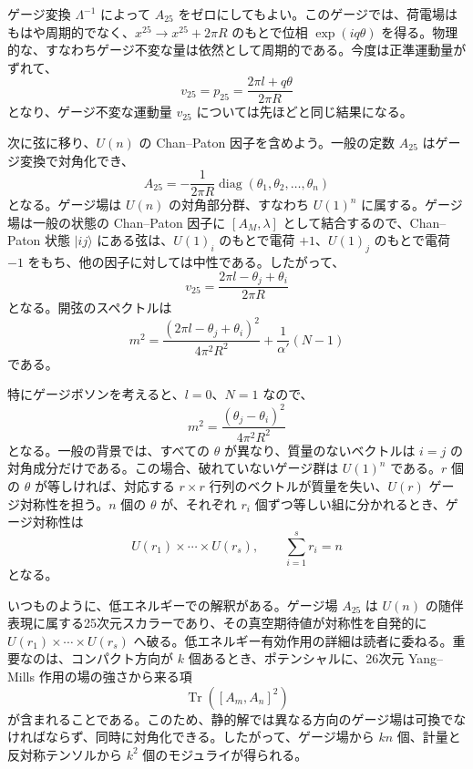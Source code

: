 ゲージ変換 $\Lambda^{-1}$ によって $A_{25}$ をゼロにしてもよい。このゲージでは、荷電場はもはや周期的でなく、$x^{25}\to x^{25}+2\pi R$ のもとで位相 $\exp(iq\theta)$ を得る。物理的な、すなわちゲージ不変な量は依然として周期的である。今度は正準運動量がずれて、
\begin{equation}
v_{25}=p_{25}=\frac{2\pi l+q\theta}{2\pi R}
\tag{8.6.7}\label{eq:8.6.7}
\end{equation}
となり、ゲージ不変な運動量 $v_{25}$ については先ほどと同じ結果になる。

次に弦に移り、$U(n)$ の Chan--Paton 因子を含めよう。一般の定数 $A_{25}$ はゲージ変換で対角化でき、
\begin{equation}
A_{25}=-\frac1{2\pi R}\operatorname{diag}(\theta_1,\theta_2,\ldots,\theta_n)
\tag{8.6.8}\label{eq:8.6.8}
\end{equation}
となる。ゲージ場は $U(n)$ の対角部分群、すなわち $U(1)^n$ に属する。ゲージ場は一般の状態の Chan--Paton 因子に $[A_M,\lambda]$ として結合するので、Chan--Paton 状態 $|ij\rangle$ にある弦は、$U(1)_i$ のもとで電荷 $+1$、$U(1)_j$ のもとで電荷 $-1$ をもち、他の因子に対しては中性である。したがって、
\begin{equation}
v_{25}=\frac{2\pi l-\theta_j+\theta_i}{2\pi R}
\tag{8.6.9}\label{eq:8.6.9}
\end{equation}
となる。開弦のスペクトルは
\begin{equation}
m^2=\frac{(2\pi l-\theta_j+\theta_i)^2}{4\pi^2R^2}
+\frac1{\alpha'}(N-1)
\tag{8.6.10}\label{eq:8.6.10}
\end{equation}
である。

特にゲージボソンを考えると、$l=0$、$N=1$ なので、
\begin{equation}
m^2=\frac{(\theta_j-\theta_i)^2}{4\pi^2R^2}
\tag{8.6.11}\label{eq:8.6.11}
\end{equation}
となる。一般の背景では、すべての $\theta$ が異なり、質量のないベクトルは $i=j$ の対角成分だけである。この場合、破れていないゲージ群は $U(1)^n$ である。$r$ 個の $\theta$ が等しければ、対応する $r\times r$ 行列のベクトルが質量を失い、$U(r)$ ゲージ対称性を担う。$n$ 個の $\theta$ が、それぞれ $r_i$ 個ずつ等しい組に分かれるとき、ゲージ対称性は
\begin{equation}
U(r_1)\times\cdots\times U(r_s),\qquad
\sum_{i=1}^{s}r_i=n
\tag{8.6.12}\label{eq:8.6.12}
\end{equation}
となる。

いつものように、低エネルギーでの解釈がある。ゲージ場 $A_{25}$ は $U(n)$ の随伴表現に属する25次元スカラーであり、その真空期待値が対称性を自発的に $U(r_1)\times\cdots\times U(r_s)$ へ破る。低エネルギー有効作用の詳細は読者に委ねる。重要なのは、コンパクト方向が $k$ 個あるとき、ポテンシャルに、26次元 Yang--Mills 作用の場の強さから来る項
\begin{equation}
\operatorname{Tr}\left([A_m,A_n]^2\right)
\tag{8.6.13}\label{eq:8.6.13}
\end{equation}
が含まれることである。このため、静的解では異なる方向のゲージ場は可換でなければならず、同時に対角化できる。したがって、ゲージ場から $kn$ 個、計量と反対称テンソルから $k^2$ 個のモジュライが得られる。

